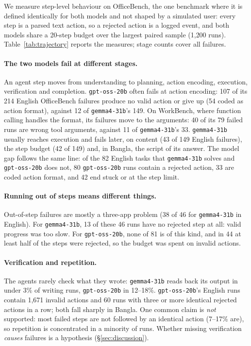 \documentclass[11pt]{article}
\newcommand{\gemma}{\texttt{gemma4-31b}}
\newcommand{\gptoss}{\texttt{gpt-oss-20b}}
\newcommand{\OB}{OfficeBench}
\newcommand{\WB}{WorkBench}
\begin{document}
We measure step-level behaviour on \OB{}, the one benchmark where it is defined identically for
both models and not shaped by a simulated user: every step is a parsed text action, so a rejected
action is a logged event, and both models share a 20-step budget over the largest paired sample
(1{,}200 runs). Table~\ref{tab:trajectory} reports the measures; stage counts cover all failures.

\paragraph{The two models fail at different stages.} An agent step moves from understanding to
planning, action encoding, execution, verification and completion. \gptoss{} often fails at
action encoding: 107 of its 214 English \OB{} failures produce no valid action or give up (54
coded as action format), against 12 of \gemma{}'s 149. On \WB{}, where function calling handles
the format, its failures move to the arguments: 40 of its 79 failed runs are wrong tool arguments,
against 11 of \gemma{}'s 33. \gemma{} usually reaches execution and fails later, on content (43 of
149 English failures), the step budget (42 of 149) and, in Bangla, the script of its answer.
The model gap follows the same line: of the 82 English tasks that \gemma{} solves and \gptoss{}
does not, 80 \gptoss{} runs contain a rejected action, 33 are coded action format, and 42 end
stuck or at the step limit.

\paragraph{Running out of steps means different things.} Out-of-step failures are mostly a
three-app problem (38 of 46 for \gemma{} in English). For \gemma{}, 13 of these 46 runs have no
rejected step at all: valid progress was too slow. For \gptoss{}, none of 81 is of this kind, and in
44 at least half of the steps were rejected, so the budget was spent on invalid actions.

\paragraph{Verification and repetition.} The agents rarely check what they wrote: \gemma{} reads
back its output in under 3\% of writing runs, \gptoss{} in 12--18\%. \gptoss{}'s English runs
contain 1{,}671 invalid actions and 60 runs with three or more identical rejected actions in a row;
both fall sharply in Bangla. One common claim is \emph{not} supported: most failed steps are not
followed by an identical action (7--17\% are), so repetition is concentrated in a minority of runs.
Whether missing verification \emph{causes} failures is a hypothesis (\S\ref{sec:discussion}).
\end{document}
